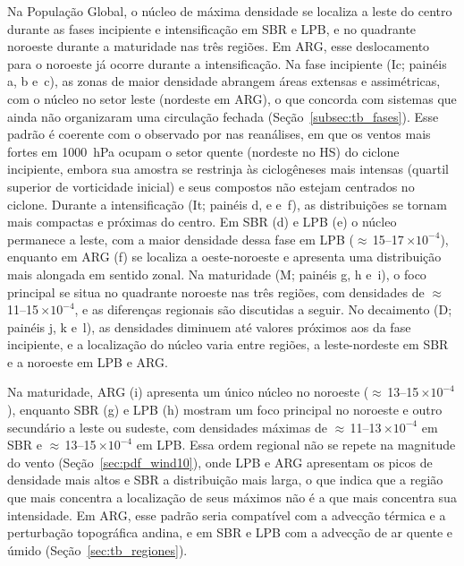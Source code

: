 Na População Global, o núcleo de máxima densidade se localiza a leste do centro durante as fases incipiente e intensificação em SBR e LPB, e no quadrante noroeste durante a maturidade nas três regiões. Em ARG, esse deslocamento para o noroeste já ocorre durante a intensificação.
Na fase incipiente (Ic; painéis a, b e~c), as zonas de maior densidade abrangem áreas extensas e assimétricas, com o núcleo no setor leste (nordeste em ARG), o que concorda com sistemas que ainda não organizaram uma circulação fechada (Seção~\ref{subsec:tb_fases}).
Esse padrão é coerente com o observado por \citet{dejesus2021multimodel} nas reanálises, em que os ventos mais fortes em 1000~hPa ocupam o setor quente (nordeste no HS) do ciclone incipiente, embora sua amostra se restrinja às ciclogêneses mais intensas (quartil superior de vorticidade inicial) e seus compostos não estejam centrados no ciclone.
Durante a intensificação (It; painéis d, e e~f), as distribuições se tornam mais compactas e próximas do centro. Em SBR (d) e LPB (e) o núcleo permanece a leste, com a maior densidade dessa fase em LPB (${\approx}$\,15--17\,$\times10^{-4}$), enquanto em ARG (f) se localiza a oeste-noroeste e apresenta uma distribuição mais alongada em sentido zonal.
Na maturidade (M; painéis g, h e~i), o foco principal se situa no quadrante noroeste nas três regiões, com densidades de ${\approx}$\,11--15\,$\times10^{-4}$, e as diferenças regionais são discutidas a seguir.
No decaimento (D; painéis j, k e~l), as densidades diminuem até valores próximos aos da fase incipiente, e a localização do núcleo varia entre regiões, a leste-nordeste em SBR e a noroeste em LPB e ARG.

Na maturidade, ARG (i) apresenta um único núcleo no noroeste (${\approx}$\,13--15\,$\times10^{-4}$), enquanto SBR (g) e LPB (h) mostram um foco principal no noroeste e outro secundário a leste ou sudeste, com densidades máximas de ${\approx}$\,11--13\,$\times10^{-4}$ em SBR e ${\approx}$\,13--15\,$\times10^{-4}$ em LPB. Essa ordem regional não se repete na magnitude do vento (Seção~\ref{sec:pdf_wind10}), onde LPB e ARG apresentam os picos de densidade mais altos e SBR a distribuição mais larga, o que indica que a região que mais concentra a localização de seus máximos não é a que mais concentra sua intensidade.
Em ARG, esse padrão seria compatível com a advecção térmica e a perturbação topográfica andina, e em SBR e LPB com a advecção de ar quente e úmido (Seção~\ref{sec:tb_regiones}).

